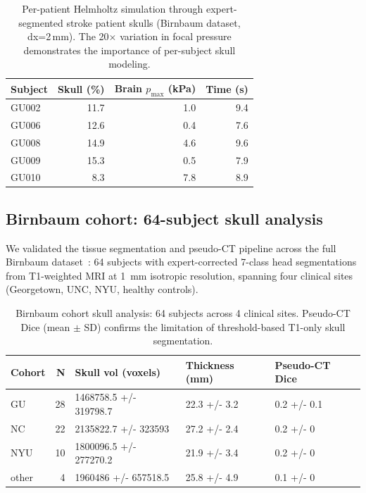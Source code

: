 \documentclass[11pt,a4paper]{article}\usepackage[]{graphicx}\usepackage[]{xcolor}
\begin{document}
\begin{table}

\caption{\label{tab:birnbaum_sim}Per-patient Helmholtz simulation through expert-segmented stroke patient skulls (Birnbaum dataset, dx=2\,mm). The 20$\times$ variation in focal pressure demonstrates the importance of per-subject skull modeling.}
\centering
\begin{tabular}[t]{lrrr}
\toprule
Subject & Skull (\%) & Brain $p_{\max}$ (kPa) & Time (s)\\
\midrule
GU002 & 11.7 & 1.0 & 9.4\\
GU006 & 12.6 & 0.4 & 7.6\\
GU008 & 14.9 & 4.6 & 9.6\\
GU009 & 15.3 & 0.5 & 7.9\\
GU010 & 8.3 & 7.8 & 8.9\\
\bottomrule
\end{tabular}
\end{table}



\subsection{Birnbaum cohort: 64-subject skull analysis}

We validated the tissue segmentation and pseudo-CT pipeline across the
full Birnbaum dataset~\citep{Birnbaum2025}: 64 subjects with
expert-corrected 7-class head segmentations from T1-weighted MRI at
\SI{1}{\milli\metre} isotropic resolution, spanning four clinical
sites (Georgetown, UNC, NYU, healthy controls).

\begin{table}

\caption{\label{tab:birnbaum_cohort}Birnbaum cohort skull analysis: 64 subjects across 4 clinical sites. Pseudo-CT Dice (mean $\pm$ SD) confirms the limitation of threshold-based T1-only skull segmentation.}
\centering
\begin{tabular}[t]{lrlll}
\toprule
Cohort & N & Skull vol (voxels) & Thickness (mm) & Pseudo-CT Dice\\
\midrule
GU & 28 & 1468758.5 +/- 319798.7 & 22.3 +/- 3.2 & 0.2 +/- 0.1\\
NC & 22 & 2135822.7 +/- 323593 & 27.2 +/- 2.4 & 0.2 +/- 0\\
NYU & 10 & 1800096.5 +/- 277270.2 & 21.9 +/- 3.4 & 0.2 +/- 0\\
other & 4 & 1960486 +/- 657518.5 & 25.8 +/- 4.9 & 0.1 +/- 0\\
\bottomrule
\end{tabular}
\end{table}
\end{document}
